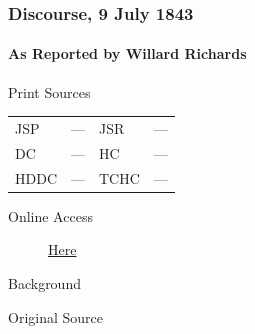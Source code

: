 		\subsubsection{Discourse, 9 July 1843}
			\label{EMS-1843-JS-9-JUL-1843}
			
			\paragraph{As Reported by Willard Richards}
				\label{EMS-1843-JS-9-JUL-1843-WR}
			
				\begin{description}
					\item[Print Sources]
				\end{description}

					\begin{tabular}{p{0.5in}p{1in}p{0.5in}p{1in}}
					JSP	 	& ---		& JSR 		& --- \\
					DC	 	& ---		& HC 		& --- \\
					HDDC 	& ---		& TCHC 		& --- \\
					\end{tabular}
				
				\begin{description}
					\item[Online Access] \href{https://www.josephsmithpapers.org/paper-summary/discourse-9-july-1843-as-reported-by-willard-richards/1}{Here}
				\end{description}
				
				\begin{description}
					\item[Background]
				\end{description}
				
				
				\begin{description}
					\item[Original Source]
				\end{description}
				
